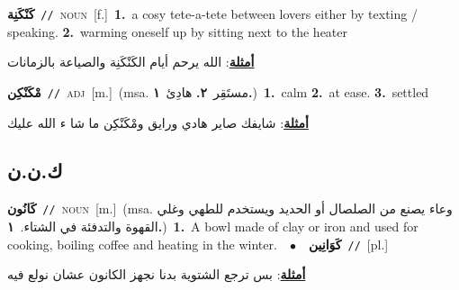\documentclass[10pt,a4paper,twoside]{article} %
\begin{document}
\begin{multicols}{2}
{\setlength\topsep{0pt}\textbf{\foreignlanguage{arabic}{كَنْكَنِة}}\ {\color{gray}\texttt{//}\color{black}}\ \textsc{noun}\ [f.]\ \textbf{1.}~a cosy tete-a-tete between lovers either by texting / speaking.  \textbf{2.}~warming oneself up by sitting next to the heater\  \begin{flushright}\color{gray}\foreignlanguage{arabic}{\textbf{\underline{\foreignlanguage{arabic}{أمثلة}}}: الله يرحم أيام الكَنْكَنِة والصياعة بالزمانات}\end{flushright}\color{black}} \vspace{2mm}

{\setlength\topsep{0pt}\textbf{\foreignlanguage{arabic}{مْكَنْكِن}}\ {\color{gray}\texttt{//}\color{black}}\ \textsc{adj}\ [m.]\ \color{gray}(msa. \foreignlanguage{arabic}{مستَقِر}~\foreignlanguage{arabic}{\textbf{٢.}}  \foreignlanguage{arabic}{هادِئ}~\foreignlanguage{arabic}{\textbf{١.}})\color{black}\ \textbf{1.}~calm  \textbf{2.}~at ease.  \textbf{3.}~settled\  \begin{flushright}\color{gray}\foreignlanguage{arabic}{\textbf{\underline{\foreignlanguage{arabic}{أمثلة}}}: شايفك صاير هادي ورايق ومْكَنْكِن ما شا ء الله عليك}\end{flushright}\color{black}} \vspace{2mm}

\vspace{-3mm}
\subsection*{\color{blue}\foreignlanguage{arabic}{ك.ن.ن}\color{blue}{}} 

{\setlength\topsep{0pt}\textbf{\foreignlanguage{arabic}{كَانُون}}\ {\color{gray}\texttt{//}\color{black}}\ \textsc{noun}\ [m.]\ \color{gray}(msa. \foreignlanguage{arabic}{وعاء يصنع من الصلصال أو الحديد ويستخدم للطهي وغلي القهوة والتدفئة في الشتاء.}~\foreignlanguage{arabic}{\textbf{١.}})\color{black}\ \textbf{1.}~A bowl made of clay or iron and used for cooking, boiling coffee and heating in the winter.\ \ $\bullet$\ \ \setlength\topsep{0pt}\textbf{\foreignlanguage{arabic}{كَوَانِين}}\ {\color{gray}\texttt{//}\color{black}}\ [pl.]\  \begin{flushright}\color{gray}\foreignlanguage{arabic}{\textbf{\underline{\foreignlanguage{arabic}{أمثلة}}}: بس ترجع الشتوية بدنا نجهز الكانون عشان نولع فيه}\end{flushright}\color{black}} \vspace{2mm}


\end{multicols}
\end{document}
